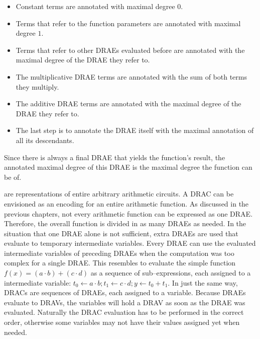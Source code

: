 \begin{itemize}

  \item Constant terms are annotated with maximal degree $0$.

  \item Terms that refer to the function parameters are annotated with maximal
    degree $1$.

  \item Terms that refer to other DRAEs evaluated before are annotated with the
    maximal degree of the DRAE they refer to.

  \item The multiplicative DRAE terms are annotated with the sum of both terms
    they multiply.

  \item The additive DRAE terms are annotated with the maximal degree of the
    DRAE they refer to.

  \item The last step is to annotate the DRAE itself with the maximal annotation
    of all its descendants.

\end{itemize}

Since there is always a final DRAE that yields the function's result, the
annotated maximal degree of this DRAE is the maximal degree the function can be
of.


%
%
\label{sec:drac}

 are representations of entire
arbitrary arithmetic circuits. A DRAC can be envisioned as an encoding for an
entire arithmetic function. As discussed in the previous chapters, not every
arithmetic function can be expressed as one DRAE. Therefore, the overall
function is divided in as many DRAEs as needed. In the situation that one DRAE
alone is not sufficient, extra DRAEs are used that evaluate to temporary
intermediate variables. Every DRAE can use the evaluated intermediate variables
of preceding DRAEs when the computation was too complex for a single DRAE. This
resembles to evaluate the simple function $f(x) = (a \cdot b) + (c \cdot d)$ as
a sequence of sub--expressions, each assigned to a intermediate variable: $t_0
\leftarrow a \cdot b; t_1 \leftarrow c \cdot d; y \leftarrow t_0 + t_1$.  In
just the same way, DRACs are sequences of DRAEs, each assigned to a variable.
Because DRAEs evaluate to DRAVs, the variables will hold a DRAV as soon as the
DRAE was evaluated. Naturally the DRAC evaluation has to be performed in the
correct order, otherwise some variables may not have their values assigned yet
when needed.


